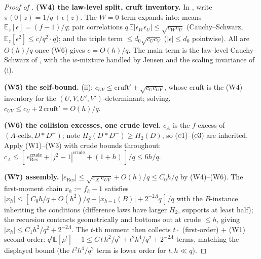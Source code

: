 \documentclass{article}
\theoremstyle{definition}
\begin{document}
\begin{proof}[Proof of ]
\textbf{(W4) the law-level split, cruft inventory.} In , write $\pi(0 \mid z) = 1/q + \epsilon(z)$. The $W = 0$ term expands into: means $\mathbb{E}_z[\epsilon] = (f-1)/q$; pair correlations $q\,\mathbb{E}|\epsilon_W \epsilon_U| \leq \sqrt{c_W c_U}$ (Cauchy--Schwarz, $\mathbb{E}_z[\epsilon^2] \leq c/q^2 \cdot q$); and the triple term $\leq d_0 \sqrt{c_U c_V}$ ($|\epsilon| \leq d_0$ pointwise). All are $O(h)/q$ once (W6) gives $c = O(h)/q$. The main term is the law-level Cauchy--Schwarz of , with the $w$-mixture handled by Jensen and the scaling invariance of (i).

\textbf{(W5) the self-bound.} (ii): $c_{UV} \leq \mathrm{cruft}' + \sqrt{c_U c_{UV}}$, whose cruft is the (W4) inventory for the $(U,V,U',V')$-determinant; solving, $c_{UV} \leq c_U + 2\,\mathrm{cruft}' = O(h)/q$.

\textbf{(W6) the collision excesses, one crude level.} $c_A$ is the $f$-excess of $(A\text{-cells}, D \ast D^-)$; note $H_2(D \ast D^-) \geq H_2(D)$, so \textsc{(c1)}--\textsc{(c3)} are inherited. Apply (W1)--(W3) with crude bounds throughout: $c_A \leq [\,e^{\mathrm{crude}}_{\mathrm{Res}} + |j^2 - 1|^{\mathrm{crude}} + (1+h)\,]/q \leq 6h/q$.

\textbf{(W7) assembly.} $|e_{\mathrm{Res}}| \leq \sqrt{c_X\, c_{UV}} + O(h)/q \leq C_0 h/q$ by (W4)--(W6). The first-moment chain $x_h := f_h - 1$ satisfies $|x_h| \leq [\,C_0 h/q + O(h^2)/q + |x_{h-1}(B)| + 2^{-2\Lambda}q\,]/q$ with the $B$-instance inheriting the conditions (difference laws have larger $H_2$, supports at least half); the recursion contracts geometrically and bottoms out at crude $\leq h$, giving $|x_h| \leq C_1 h^2/q^2 + 2^{-2\Lambda}$. The $t$-th moment then collects $t \cdot$ (first-order) $+$ (W1) second-order: $q^t\mathbb{E}[\rho^t] - 1 \leq C\,t\,h^2/q^2 + t^2 h^4/q^2 + 2^{-2\Lambda}$-terms, matching the displayed bound (the $t^2 h^4/q^2$ term is lower order for $t, h \ll q$).
\end{proof}
\end{document}
